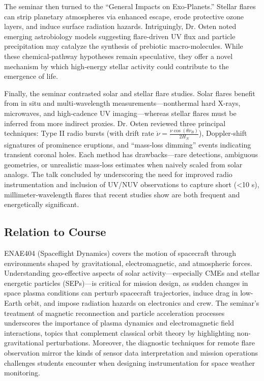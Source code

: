 The seminar then turned to the “General Impacts on Exo‐Planets.” Stellar flares can strip planetary atmospheres via enhanced escape, erode protective ozone layers, and induce surface radiation hazards. Intriguingly, Dr. Osten noted emerging astrobiology models suggesting flare-driven UV flux and particle precipitation may catalyze the synthesis of prebiotic macro-molecules. While these chemical‐pathway hypotheses remain speculative, they offer a novel mechanism by which high‐energy stellar activity could contribute to the emergence of life.

Finally, the seminar contrasted solar and stellar flare studies. Solar flares benefit from in situ and multi‐wavelength measurements—nonthermal hard X-rays, microwaves, and high‐cadence UV imaging—whereas stellar flares must be inferred from more indirect proxies. Dr. Osten reviewed three principal techniques: Type II radio bursts (with drift rate $\dot{\nu} = \frac{\nu\cos(\theta\nu_B)}{2H_N}$), Doppler‐shift signatures of prominence eruptions, and “mass‐loss dimming” events indicating transient coronal holes. Each method has drawbacks—rare detections, ambiguous geometries, or unrealistic mass‐loss estimates when naively scaled from solar analogs. The talk concluded by underscoring the need for improved radio instrumentation and inclusion of UV/NUV observations to capture short (<10 s), millimeter‐wavelength flares that recent studies show are both frequent and energetically significant.

\subsection*{Relation to Course}

ENAE404 (Spaceflight Dynamics) covers the motion of spacecraft through environments shaped by gravitational, electromagnetic, and atmospheric forces. Understanding geo-effective aspects of solar activity—especially CMEs and stellar energetic particles (SEPs)—is critical for mission design, as sudden changes in space plasma conditions can perturb spacecraft trajectories, induce drag in low-Earth orbit, and impose radiation hazards on electronics and crew. The seminar’s treatment of magnetic reconnection and particle acceleration processes underscores the importance of plasma dynamics and electromagnetic field interactions, topics that complement classical orbit theory by highlighting non-gravitational perturbations. Moreover, the diagnostic techniques for remote flare observation mirror the kinds of sensor data interpretation and mission operations challenges students encounter when designing instrumentation for space weather monitoring.

